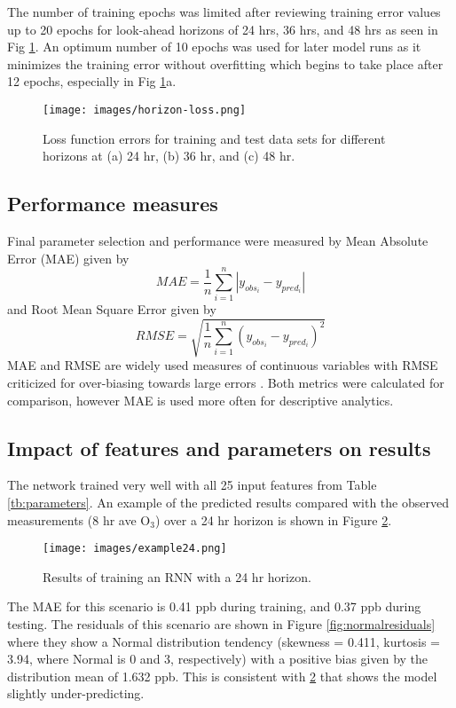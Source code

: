The number of training epochs was limited after reviewing training error values up to 20 epochs for look-ahead horizons of 24 hrs, 36 hrs, and 48 hrs as seen in Fig \ref{fig:horizon-loss}. An optimum number of 10 epochs was used for later model runs as it minimizes the training error without overfitting which begins to take place after 12 epochs, especially in Fig \ref{fig:horizon-loss}a. 
%
\begin{figure}[!htb]
\centering
\texttt{[image: images/horizon-loss.png]}
\caption[Loss function errors of training and test data sets]{Loss function errors for training and test data sets for different horizons at (a) 24 hr, (b) 36 hr, and (c) 48 hr.}
\label{fig:horizon-loss}
\end{figure}
%

\subsection{Performance measures}

Final parameter selection and performance were measured by Mean Absolute Error (MAE) given by 
%
\begin{equation}
\label{eq:MAE}
MAE = \frac{1}{n}\sum^{n}_{i=1} \left | y_{obs_{i}}- y_{pred_{i}} \right |
\end{equation}
%
and Root Mean Square Error given by
%
\begin{equation}
\label{eq:RMSE}
RMSE = \sqrt{\frac{1}{n}\sum^{n}_{i=1} \left ( y_{obs_{i}}- y_{pred_{i}} \right )^{2}}
\end{equation}
%
MAE and RMSE are widely used measures of continuous variables with RMSE criticized for over-biasing towards large errors \citep{Chai2014, Willmott2005}. Both metrics were calculated for comparison, however MAE is used more often for descriptive analytics.

\subsection{Impact of features and parameters on results}

The network trained very well with all 25 input features from Table \ref{tb:parameters}. An example of the predicted results compared with the observed measurements (8 hr ave O$_{3}$) over a 24 hr horizon is shown in Figure \ref{fig:example24}.
%
\begin{figure}[!htb]
\centering
\texttt{[image: images/example24.png]}
\caption{Results of training an RNN with a 24 hr horizon.}
\label{fig:example24}
\end{figure}
%
The MAE for this scenario is 0.41 ppb during training, and 0.37 ppb during testing. The residuals of this scenario are shown in Figure \ref{fig:normalresiduals} where they show a Normal distribution tendency (skewness = 0.411, kurtosis = 3.94, where Normal is 0 and 3, respectively) with a positive bias given by the distribution mean of 1.632 ppb. This is consistent with \ref{fig:example24} that shows the model slightly under-predicting.

